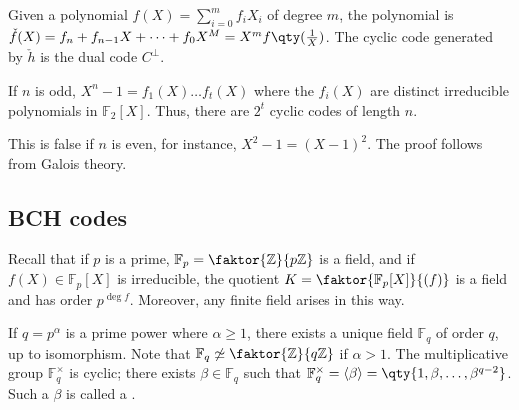 \begin{remark}
    Given a polynomial $f(X) = \sum_{i=0}^m f_i X_i$ of degree $m$, the  polynomial is $\check{f}(X) = f_n + f_{n-1}X + \dots + f_0 X^M = X^m f\qty(\frac{1}{X})$.
    The cyclic code generated by $\check{h}$ is the dual code $C^\perp$.
\end{remark}
\begin{lemma}
    If $n$ is odd, $X^n - 1 = f_1(X) \dots f_t(X)$ where the $f_i(X)$ are distinct irreducible polynomials in $\mathbb F_2[X]$.
    Thus, there are $2^t$ cyclic codes of length $n$.
\end{lemma}
This is false if $n$ is even, for instance, $X^2 - 1 = (X - 1)^2$.
The proof follows from Galois theory.

\subsection{BCH codes}
Recall that if $p$ is a prime, $\mathbb F_p = \faktor{\mathbb Z}{p\mathbb Z}$ is a field, and if $f(X) \in \mathbb F_p[X]$ is irreducible, the quotient $K = \faktor{\mathbb F_p[X]}{(f)}$ is a field and has order $p^{\deg f}$.
Moreover, any finite field arises in this way.

If $q = p^\alpha$ is a prime power where $\alpha \geq 1$, there exists a unique field $\mathbb F_q$ of order $q$, up to isomorphism.
Note that $\mathbb F_q \not\simeq \faktor{\mathbb Z}{q\mathbb Z}$ if $\alpha > 1$.
The multiplicative group $\mathbb F_q^\times$ is cyclic; there exists $\beta \in \mathbb F_q$ such that $\mathbb F_q^\times = \genset{\beta} = \qty{1, \beta, \dots, \beta^{q-2}}$.
Such a $\beta$ is called a .

